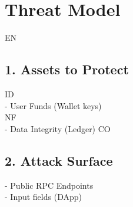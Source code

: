 \documentclass[12pt,landscape,a4paper]{article}
\begin{document}
\section*{Threat Model}
\vspace{0.5em}
\vspace{0.5em}
\vspace{0.5em}
\vspace{0.5em}
EN\\
\subsection*{1. Assets to Protect}
\vspace{0.5em}
\vspace{0.5em}
\vspace{0.5em}
\vspace{0.5em}
ID\\
- User Funds (Wallet keys)\\
\vspace{0.5em}
\vspace{0.5em}
\vspace{0.5em}
NF\\
- Data Integrity (Ledger)                 CO\\
\subsection*{2. Attack Surface}
- Public RPC Endpoints\\
- Input fields (DApp)\\
\vspace{0.5em}
\vspace{0.5em}
\end{document}
